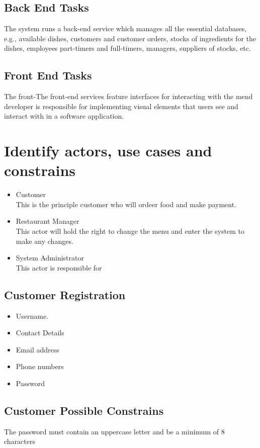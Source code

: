 \documentclass[11pt]{article}
\begin{document}
\subsection{\Large Back End Tasks }
The system runs a back-end service which manages all the essential databases, e.g., available dishes, customers and customer orders, stocks of ingredients for the dishes, employees part-timers and full-timers, managers, suppliers of stocks, etc.
\subsection{\Large Front End Tasks }
The front-The front-end services feature interfaces for interacting with the mend developer is responsible for implementing visual elements that users see and interact with in a software application.
\section{\Large Identify actors, use cases and constrains}
\begin{itemize}
 \item Customer\\
 This is the principle customer who will ordeer food and make payment.
 \item Restaurant Manager\\
 This actor will hold the right to change the menu and enter the system to make any changes.
 \item System Administrator\\
 This actor is responsible for 
\end{itemize} 
\subsection{\Large Customer Registration}
\begin {itemize}
 \item  Username.
 \item Contact Details 
 \item Email address
 \item Phone numbers 
 \item Password 
\end{itemize}
\subsection{\Large Customer Possible Constrains}
The password must contain an uppercase letter and be a minimum of 8 characters
\\
 
\end{document}
